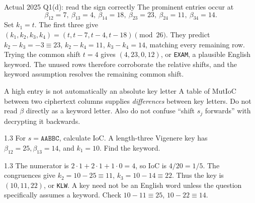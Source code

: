 \documentclass[11pt,a4paper]{article}
\begin{document}
\begin{example}{Actual 2025 Q1(d): read the sign correctly}
The prominent entries occur at
\[\beta_{12}=7,\ \beta_{13}=4,\ \beta_{14}=18,\ \beta_{23}=23,\ \beta_{24}=11,\ \beta_{34}=14.\]
Set \(k_1=t\). The first three give \((k_1,k_2,k_3,k_4)=(t,t-7,t-4,t-18)\pmod{26}\). They predict \(k_2-k_3=-3\equiv23\), \(k_2-k_4=11\), \(k_3-k_4=14\), matching every remaining row. Trying the common shift \(t=4\) gives \((4,23,0,12)\), or \texttt{EXAM}, a plausible English keyword. The unused rows therefore corroborate the relative shifts, and the keyword assumption resolves the remaining common shift.
\end{example}
\begin{tip}{A high entry is not automatically an absolute key letter}
A table of MutIoC between two ciphertext columns supplies \emph{differences} between key letters. Do not read \(\beta\) directly as a keyword letter. Also do not confuse ``shift \(s_j\) forwards'' with decrypting it backwards.
\end{tip}
\begin{question}{1.3}
For \(s=\texttt{AABBC}\), calculate IoC. A length-three Vigenere key has \(\beta_{12}=25,\beta_{13}=14\), and \(k_1=10\). Find the keyword.
\end{question}
\begin{answer}{1.3}
The numerator is \(2\cdot1+2\cdot1+1\cdot0=4\), so IoC is \(4/20=1/5\). The congruences give \(k_2=10-25\equiv11\), \(k_3=10-14\equiv22\). Thus the key is \((10,11,22)\), or \texttt{KLW}. A key need not be an English word unless the question specifically assumes a keyword. Check \(10-11\equiv25\), \(10-22\equiv14\).
\end{answer}
\end{document}
